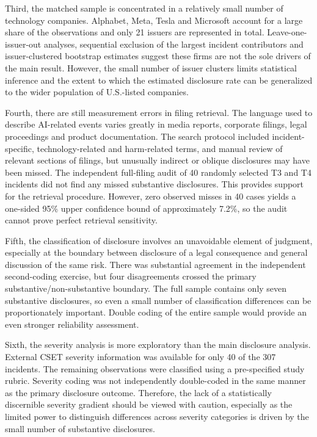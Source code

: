 \documentclass[utf8]{FrontiersinHarvard}
\begin{document}
Third, the matched sample is concentrated in a relatively small number of technology companies. Alphabet, Meta, Tesla and Microsoft account for a large share of the observations and only 21 issuers are represented in total. Leave-one-issuer-out analyses, sequential exclusion of the largest incident contributors and issuer-clustered bootstrap estimates suggest these firms are not the sole drivers of the main result. However, the small number of issuer clusters limits statistical inference and the extent to which the estimated disclosure rate can be generalized to the wider population of U.S.-listed companies.

Fourth, there are still measurement errors in filing retrieval. The language used to describe AI-related events varies greatly in media reports, corporate filings, legal proceedings and product documentation. The search protocol included incident-specific, technology-related and harm-related terms, and manual review of relevant sections of filings, but unusually indirect or oblique disclosures may have been missed. The independent full-filing audit of 40 randomly selected T3 and T4 incidents did not find any missed substantive disclosures. This provides support for the retrieval procedure. However, zero observed misses in 40 cases yields a one-sided 95\% upper confidence bound of approximately 7.2\%, so the audit cannot prove perfect retrieval sensitivity.

Fifth, the classification of disclosure involves an unavoidable element of judgment, especially at the boundary between disclosure of a legal consequence and general discussion of the same risk. There was substantial agreement in the independent second-coding exercise, but four disagreements crossed the primary substantive/non-substantive boundary. The full sample contains only seven substantive disclosures, so even a small number of classification differences can be proportionately important. Double coding of the entire sample would provide an even stronger reliability assessment.

Sixth, the severity analysis is more exploratory than the main disclosure analysis. External CSET severity information was available for only 40 of the 307 incidents. The remaining observations were classified using a pre-specified study rubric. Severity coding was not independently double-coded in the same manner as the primary disclosure outcome. Therefore, the lack of a statistically discernible severity gradient should be viewed with caution, especially as the limited power to distinguish differences across severity categories is driven by the small number of substantive disclosures.
\end{document}
